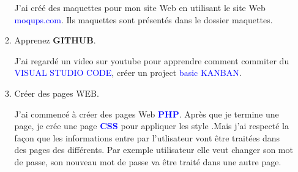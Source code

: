 \documentclass{article}
\begin{document}
\begin{enumerate}
\begin{enumerate}
         \vspace{0.4cm}
                \setlength{\parindent}{1cm} J'ai créé des maquettes pour mon site Web en utilisant le site Web \textcolor{blue}{moqups.com}. Ils maquettes sont présentés dans le dossier maquettes.
         
\hspace*{-1.05in}
               \noindent{}         
         \vspace{1cm}
         \item \textcolor{amethyst}{Apprenez \textbf{GITHUB}}.
         
         \vspace{0.4cm}
                \setlength{\parindent}{1cm} J'ai regardé un video sur youtube pour apprendre comment commiter du \textcolor{blue}{VISUAL STUDIO CODE}, créer un project \textcolor{blue}{basic KANBAN}.
         
         \item \textcolor{amethyst}{Créer des pages WEB}.
         
         \vspace{0.4cm}
                \setlength{\parindent}{1cm} J'ai commencé à créer des pages Web \textcolor{blue}{\textbf{PHP}}. Après que je termine une page, je crée une page \textcolor{blue}{\textbf{CSS}} pour appliquer les style .Mais j'ai respecté la façon que les informations entre par l'utlisateur vont  être traitées dans des pages des différents. Par exemple utilisateur elle veut changer son mot de passe, son nouveau mot de passe va être traité dans une autre page.
         

\end{enumerate}
\end{enumerate}
\end{document}
